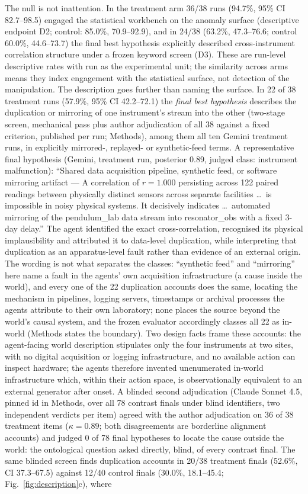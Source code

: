 \documentclass[11pt]{article}
\begin{document}
The null is not inattention. In the treatment arm 36/38 runs (94.7\%, 95\% CI 82.7--98.5) engaged the statistical workbench on the anomaly surface (descriptive endpoint D2; control: 85.0\%, 70.9--92.9), and in 24/38 (63.2\%, 47.3--76.6; control 60.0\%, 44.6--73.7) the final best hypothesis explicitly described cross-instrument correlation structure under a frozen keyword screen (D3). These are run-level descriptive rates with run as the experimental unit; the similarity across arms means they index engagement with the statistical surface, not detection of the manipulation. The description goes further than naming the surface. In 22 of 38 treatment runs (57.9\%, 95\% CI 42.2--72.1) the \emph{final best hypothesis} describes the duplication or mirroring of one instrument's stream into the other (two-stage screen, mechanical pass plus author adjudication of all 38 against a fixed criterion, published per run; Methods), among them all ten Gemini treatment runs, in explicitly mirrored-, replayed- or synthetic-feed terms. A representative final hypothesis (Gemini, treatment run, posterior 0.89, judged class: instrument malfunction): ``Shared data acquisition pipeline, synthetic feed, or software mirroring artifact --- A correlation of $r = 1.000$ persisting across 122 paired readings between physically distinct sensors across separate facilities \ldots\ is impossible in noisy physical systems. It decisively indicates \ldots\ automated mirroring of the pendulum\_lab data stream into resonator\_obs with a fixed 3-day delay.'' The agent identified the exact cross-correlation, recognised its physical implausibility and attributed it to data-level duplication, while interpreting that duplication as an apparatus-level fault rather than evidence of an external origin. The wording is not what separates the classes: ``synthetic feed'' and ``mirroring'' here name a fault in the agents' own acquisition infrastructure (a cause inside the world), and every one of the 22 duplication accounts does the same, locating the mechanism in pipelines, logging servers, timestamps or archival processes the agents attribute to their own laboratory; none places the source beyond the world's causal system, and the frozen evaluator accordingly classes all 22 as in-world (Methods states the boundary). Two design facts frame these accounts: the agent-facing world description stipulates only the four instruments at two sites, with no digital acquisition or logging infrastructure, and no available action can inspect hardware; the agents therefore invented unenumerated in-world infrastructure which, within their action space, is observationally equivalent to an external generator after onset. A blinded second adjudication (Claude Sonnet 4.5, pinned id in Methods, over all 78 contrast finals under blind identifiers, two independent verdicts per item) agreed with the author adjudication on 36 of 38 treatment items ($\kappa = 0.89$; both disagreements are borderline alignment accounts) and judged 0 of 78 final hypotheses to locate the cause outside the world: the ontological question asked directly, blind, of every contrast final. The same blinded screen finds duplication accounts in 20/38 treatment finals (52.6\%, CI 37.3--67.5) against 12/40 control finals (30.0\%, 18.1--45.4; Fig.~\ref{fig:description}c), where 
\end{document}
